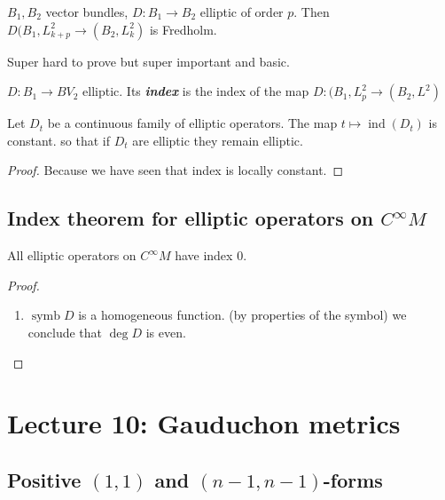 \begin{thm}\leavevmode
\(B_1,B_2\) vector bundles, \(D: B_1 \to B_2\) elliptic of order $p$. Then \(D(B_1,L^2_{k+p}\to (B_2,L^2_k)\) is Fredholm.
\end{thm}

Super hard to prove but super important and basic.

\begin{defn}\leavevmode
\(D: B_1 \to BV_2\) elliptic. Its \textit{\textbf{index}} is the index of the map \(D:(B_1,L^2_p \to (B_2,L^2)\)\end{defn}

\begin{coro}\leavevmode
Let \(D_t\) be a continuous family of elliptic operators. The map \(t \mapsto \operatorname{ind}(D_t)\) is constant. so that if \(D_t\) are elliptic they remain elliptic.
\end{coro}

\begin{proof}\leavevmode
Because we have seen that index is locally constant.
\end{proof}

\subsection{Index theorem for elliptic operators on \(C^\infty M\)}

\begin{thm}\leavevmode
All elliptic operators on \(C^\infty M\) have index 0.
\end{thm}

\begin{proof}\leavevmode
\begin{enumerate}[label=\textbf{Step \arabic*}]
\item \(\operatorname{symb}D\) is a homogeneous function. (by properties of the symbol) we conclude that \(\operatorname{deg}D\) is even.
\end{enumerate}
\end{proof}

\section{Lecture 10: Gauduchon metrics}

\subsection{Positive \((1,1)\) and \((n-1,n-1)\)-forms}

